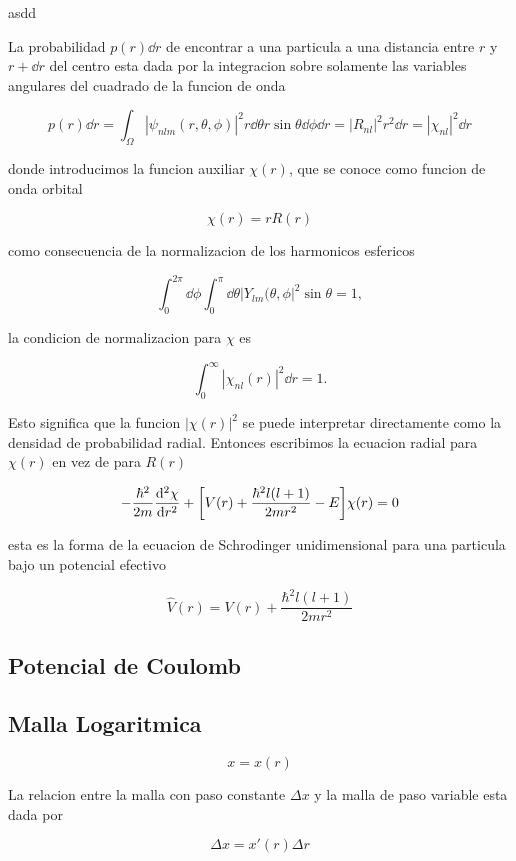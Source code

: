 \documentclass[11pt]{article}
\begin{document}
asdd

La probabilidad \(p(r) \dd{r}\) de encontrar a una particula a una distancia entre \(r\) y \(r + \dd{r}\) del centro esta dada por la integracion sobre solamente las variables angulares del cuadrado de la funcion de onda

\[ p(r) \dd{r} = \int_{\Omega} |\psi_{nlm}(r,\theta,\phi)|^2 r \dd{\theta}r\sin\theta\dd{\phi} \dd{r} = |R_{nl}|^2 r^2 \dd{r} = |\chi_{nl}|^2 \dd{r}  \]

donde introducimos la funcion auxiliar \(\chi(r)\), que se conoce como funcion de onda orbital

\[ \chi(r) = rR(r) \]

como consecuencia de la normalizacion de los harmonicos esfericos

\[ \int_0^{2\pi} \dd{\phi} \int_0^{\pi}\dd{\theta}|Y_{lm}(\theta,\phi|^2 \sin\theta = 1, \]

la condicion de normalizacion para \(\chi\) es

\[ \int_0^{\infty} | \chi_{nl}(r)|^2 \dd{r} = 1. \]

Esto significa que la funcion \(|\chi(r)|^2\) se puede interpretar directamente como la densidad de probabilidad radial. Entonces escribimos la ecuacion radial para \(\chi(r)\) en vez de para \(R(r)\)

\begin{equation}
\label{eq:schr-rad}
- \frac{\hbar^2}{2m}\dv[2]{\chi}{r} + \qty[V(r) + \frac{\hbar^2 l (l+1)}{2mr^2} - E] \chi(r) = 0
\end{equation}

esta es la forma de la ecuacion de Schrodinger unidimensional para una particula bajo un potencial efectivo

\[ \hat{V}(r) = V(r) + \frac{\hbar^2 l(l+1)}{2mr^2} \]
\subsection{Potencial de Coulomb}
\label{sec:org47f0958}


\subsection{Malla Logaritmica}
\label{sec:orge78335f}

\[ x = x(r) \]

La relacion entre la malla con paso constante \(\Delta x\) y la malla de paso variable esta dada por

\[ \Delta x  = x'(r) \Delta r \]
\end{document}
